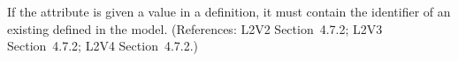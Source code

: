 If the  attribute is given a
value in a \Compartment definition, it must contain the identifier
of an existing \CompartmentType defined in the model.
(References: L2V2 Section~4.7.2; L2V3
Section~4.7.2; L2V4 Section~4.7.2.)

